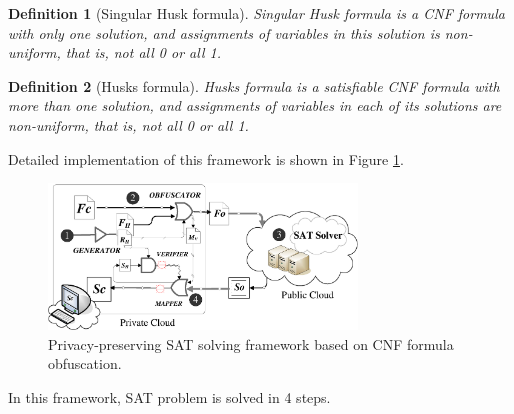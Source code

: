 \documentclass[conference,compsocconf]{IEEEtran}
\newtheorem{definition}{\textbf{Definition}}
\begin{document}
\begin{definition}[Singular Husk formula]\label{Singular-Husk-formula-definition}
Singular Husk formula is a CNF formula with only one solution,
and assignments of variables in this solution is non-uniform,
that is,
not all 0 or all 1.
\end{definition}

\begin{definition}[Husks formula]\label{Husks-formula-definition}
Husks formula is a satisfiable CNF formula with more than one solution,
and assignments of variables in each of its solutions are non-uniform,
that is,
not all 0 or all 1.
\end{definition}

Detailed implementation of this framework is shown in Figure \ref{fig_cldSAT}.
\begin{figure}
\footnotesize\centering
\centerline{\includegraphics[width=8.2cm]{Visio-cloudsat.eps}}
\caption{Privacy-preserving SAT solving framework based on CNF formula obfuscation.}
\label{fig_cldSAT}
\end{figure}
In this framework, SAT problem is solved in 4 steps.\\
\end{document}
